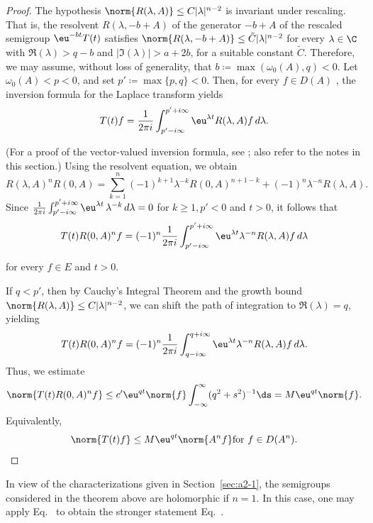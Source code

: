 \begin{proof} 
The hypothesis $\norm{ R(\lambda, A) } \leq C | \lambda |^{n-2}$ is invariant under rescaling. 
That is, the resolvent $R(\lambda, -b+A)$ of the generator $-b+A$ of the rescaled semigroup $\eu^{-bt} T(t)$ satisfies
$\norm{ R(\lambda, -b+A) } \leq \tilde{C} | \lambda |^{n-2}$ for every $\lambda \in \C$ with $\Re(\lambda) > q-b$ and $| \Im(\lambda) | > a+2b$, for a suitable constant $\tilde{C}$. 
Therefore, we may assume, without loss of generality, that $b \coloneq  \max(\omega_{0}(A), q) < 0$. 
Let $\omega_{0}(A) < p < 0$, and set $p' \coloneq  \max\{p, q\} < 0$. 
Then, for every $f \in D(A)$ , the inversion formula for the Laplace transform yields 
\begin{equation} \label{eq:a4-1.12}
T(t) f = \frac{1}{2\pi i} \int_{p' - i\infty}^{p' + i\infty} \eu^{\lambda t} R(\lambda, A) f \, d\lambda.
\end{equation}

 (For a proof of the vector-valued inversion formula, see \textcite[p.66]{widder:1946}; also refer to the notes in this section.)
Using the resolvent equation, we obtain 
\[ 
R(\lambda, A)^n R(0, A) = \sum_{k=1}^{n} (-1)^{k+1} \lambda^{-k} R(0, A)^{n+1-k} + (-1)^n \lambda^{-n} R(\lambda, A).
\]
Since 
$ \frac {1}{2\pi i} \int_{p' - i\infty}^{p' + i\infty} \eu^{\lambda t} \, \lambda^{-k} \, d\lambda = 0 $ for $ k \geq 1, p' < 0 $ and $ t > 0$, it follows that
 \begin{equation}\label{eq:a4-1.13}
   T(t) R(0, A)^n f = (-1)^n \frac{1}{2\pi i} \int_{p' - i\infty}^{p' + i\infty} \eu^{\lambda t} \lambda^{-n} R(\lambda, A) f \, d\lambda
    \end{equation}
    
 for every $f \in E$ and $t > 0$.
    
 If\/ $q < p'$, then by Cauchy's Integral Theorem and the growth bound $\norm{ R(\lambda, A) } \leq C | \lambda |^{n-2}$, we can shift the path of integration to 
 $\Re(\lambda) = q$, yielding
\[
    T(t) R(0, A)^n f = (-1)^n \frac{1}{2\pi i} \int_{q - i\infty}^{q + i\infty} \eu^{\lambda t} \lambda^{-n} R(\lambda, A) f \, d\lambda.
\]
Thus, we estimate  
\[
\norm{ T(t) R(0,A)^n f } \leq c' \eu^{q t} \norm{ f } \int_{-\infty}^{\infty} (q^2 + s^2)^{-1}\ds = M \eu^{q t} \norm{ f }.
\]
Equivalently,
\[
\norm{ T(t) f } \leq M \eu^{q t} \norm{ A^n f } \text{for $f \in D(A^n)$.}
\]
\end{proof}
In view of the characterizations given in Section~\ref{sec:a2-1},  the semigroups considered in the theorem above are holomorphic if\/ $ n = 1 $. 
In this case, one may apply Eq.~ to obtain the stronger statement Eq.~.

